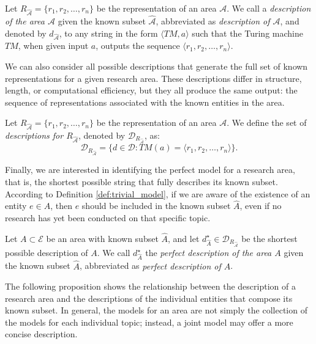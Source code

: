 \begin{definition}
Let $R_{\hat{\mathcal{A}}} = \{ r_1, r_2, \ldots, r_n \}$ be the representation of an area $\mathcal{A}$. We call a \emph{description of the area $\mathcal{A}$}\index{} given the known subset $\hat{\mathcal{A}}$, abbreviated as \emph{description of $\mathcal{A}$}, and denoted by $d_{\hat{\mathcal{A}}}$, to any string in the form $\langle TM, a\rangle$ such that the Turing machine $TM$, when given input $a$, outputs the sequence $\langle r_1, r_2, \ldots, r_n \rangle$.
\end{definition}

We can also consider all possible descriptions that generate the full set of known representations for a given research area. These descriptions differ in structure, length, or computational efficiency, but they all produce the same output: the sequence of representations associated with the known entities in the area.

\begin{definition}
Let $R_{\hat{\mathcal{A}}} = \{ r_1, r_2, \ldots, r_n \}$ be the representation of an area $\mathcal{A}$. We define the set of \emph{descriptions for $R_{\hat{\mathcal{A}}}$}, denoted by $\mathcal{D}_{R_{\hat{\mathcal{A}}}}$, as:
\[
\mathcal{D}_{R_{\hat{\mathcal{A}}}} = \{ d \in \mathcal{D} : TM(a) = \langle r_1, r_2, \ldots, r_n\rangle \}.
\]
\end{definition}

Finally, we are interested in identifying the perfect model for a research area, that is, the shortest possible string that fully describes its known subset. According to Definition \ref{def:trivial_model}, if we are aware of the existence of an entity $e \in A$, then $e$ should be included in the known subset $\hat{A}$, even if no research has yet been conducted on that specific topic.

\begin{definition}
Let $A \subset \mathcal{E}$ be an area with known subset $\hat{A}$, and let $d_{\hat{A}}^{\star} \in 
\mathcal{D}_{R_{\hat{\mathcal{A}}}}$ be the shortest possible description of $A$. We call  $d_{\hat{A}}^{\star}$ the \emph{perfect description of the area $A$} given the known subset $\hat{A}$, abbreviated as \emph{perfect description of $A$}.
\end{definition}

The following proposition shows the relationship between the description of a research area and the descriptions of the individual entities that compose its known subset. In general, the models for an area are not simply the collection of the models for each individual topic; instead, a joint model may offer a more concise description.

